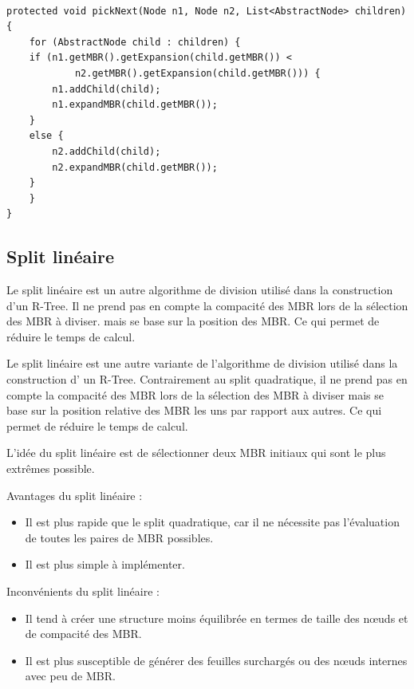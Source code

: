 \documentclass {article}
\begin{document}
\begin{verbatim}

protected void pickNext(Node n1, Node n2, List<AbstractNode> children) {
    for (AbstractNode child : children) {
	if (n1.getMBR().getExpansion(child.getMBR()) < 
			n2.getMBR().getExpansion(child.getMBR())) {
	    n1.addChild(child);
	    n1.expandMBR(child.getMBR());
	} 
	else {
	    n2.addChild(child);
	    n2.expandMBR(child.getMBR());
	}
    }
}
\end{verbatim}



\subsection {Split linéaire}

Le split linéaire est un autre algorithme de division utilisé dans la construction d'un R-Tree. 
Il ne prend pas en compte la compacité des MBR lors de la sélection des MBR à diviser.
mais se base sur la position des MBR. Ce qui permet de réduire le temps de calcul.

Le split linéaire est une autre variante de l'algorithme de division utilisé dans la construction d'
un R-Tree. 
Contrairement au split quadratique, il ne prend pas en compte la compacité des MBR lors de la 
sélection des MBR à diviser mais se base sur la position relative des MBR les uns par rapport 
aux autres. 
Ce qui permet de réduire le temps de calcul.

L'idée du split linéaire est de sélectionner deux MBR initiaux qui sont le plus extrêmes possible.

Avantages du split linéaire :

\begin{itemize}
    \item Il est plus rapide que le split quadratique, car il ne nécessite pas l'évaluation de
	toutes les paires de MBR possibles.
    \item Il est plus simple à implémenter.

\end{itemize}
Inconvénients du split linéaire :

\begin{itemize}
    \item Il tend à créer une structure moins équilibrée en termes de taille des nœuds et de
	compacité des MBR.
    \item Il est plus susceptible de générer des feuilles surchargés ou des nœuds internes
	avec peu de MBR.

\end{itemize}
\end{document}

